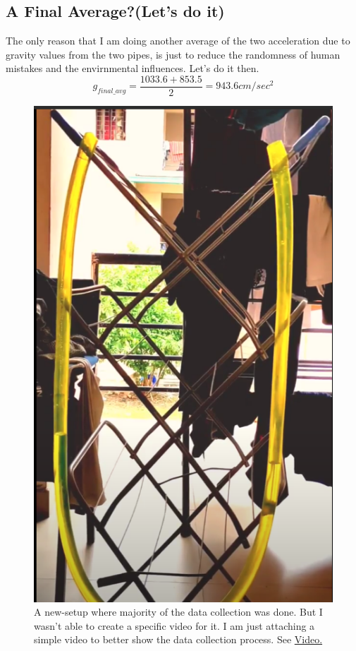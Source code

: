 \documentclass[twocolumn,11pt]{article}
\begin{document}
\subsection{A Final Average?(Let's do it)}
The only reason that I am doing another average of the two acceleration due to gravity values from the two pipes, is just to reduce the randomness of human mistakes and the envirnmental influences. Let's do it then.
\begin{equation}
    \label{Final g}
    g_{final\_avg} = \frac{1033.6 + 853.5}{2} = 943.6 cm/sec^2
\end{equation}
\begin{figure}[H]
    \centering
    \includegraphics[scale =0.4]{new_setup.png}
    \caption{A new-setup where majority of the data collection was done. But I wasn't able to create a specific video for it. I am just attaching a simple video to better show the data collection process. See \href{https://drive.google.com/file/d/1B0Kj0nX2NHbx1PAJz2C6tWp1hRgPLPga/view?usp=sharing}{Video.} }
    \label{Video_demo_new_setup}
\end{figure}
\end{document}
